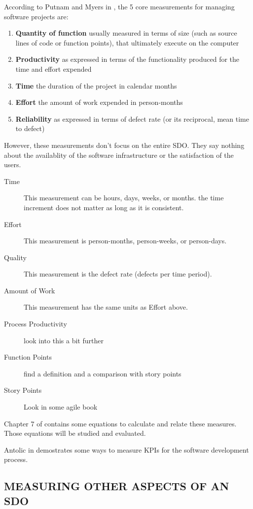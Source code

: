 \documentclass[SDSUThesis.tex]{subfiles}
\begin{document}
According to Putnam and Myers in \cite{Putnam2013}, the 5 core measurements for managing software
projects are:

\begin{enumerate}
    \item \textbf{Quantity of function} usually measured in terms of size (such as source lines of code or function points), that ultimately execute on the computer
    \item \textbf{Productivity} as expressed in terms of the functionality produced for the time and effort expended
    \item \textbf{Time} the duration of the project in calendar months
    \item \textbf{Effort} the amount of work expended in person-months
    \item \textbf{Reliability} as expressed in terms of defect rate (or its reciprocal, mean time to defect)
\end{enumerate}
However, these measurements don't focus on the entire SDO. They say nothing about the availablity of the software infrastructure or the satisfaction of the users.

\begin{description}
  \item[Time] This measurement can be hours, days, weeks, or months.  the time increment does not matter as long as it is consistent.
  \item[Effort] This measurement is person-months, person-weeks, or person-days.
  \item[Quality] This measurement is the defect rate (defects per time period).
  \item[Amount of Work] This measurement has the same units as Effort above. 
  \item[Process Productivity] look into this a bit further
  \item[Function Points] find a definition and a comparison with story points
  \item[Story Points] Look in some agile book
\end{description}

Chapter 7 of \cite{Putnam2013} contains some equations to calculate and relate
these measures. Those equations will be studied and evaluated.

Antolic in \cite{Antolic2008} demostrates some ways to measure KPIs for the  software development process.

\subsection{MEASURING OTHER ASPECTS OF AN SDO}
\end{document}
